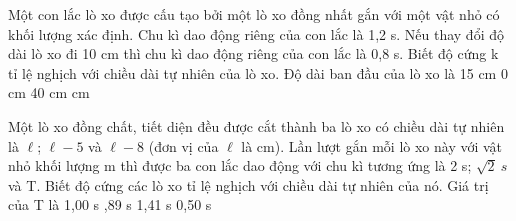 \begin{ex}%
Một con lắc lò xo được cấu tạo bởi một lò xo đồng nhất gắn với một vật nhỏ có khối lượng xác định. Chu kì dao động riêng của con lắc là 1,2 s. Nếu thay đổi độ dài lò xo đi 10 cm thì chu kì dao động riêng của con lắc là 0,8 s. Biết độ cứng k tỉ lệ nghịch với chiều dài tự nhiên của lò xo. Độ dài ban đầu của lò xo là
\choice
{15 cm}
{0 cm}
{40 cm}
{ cm}
\end{ex} 

\begin{ex}%
Một lò xo đồng chất, tiết diện đều được cắt thành ba lò xo có chiều dài tự nhiên là $\ell$; $\ell-5$ và $\ell-8$ (đơn vị của $\ell$ là cm). Lần lượt gắn mỗi lò xo này với vật nhỏ khối lượng m thì được ba con lắc dao động với chu kì tương ứng là 2 s; $\sqrt{2}\ s$ và T. Biết độ cứng các lò xo tỉ lệ nghịch với chiều dài tự nhiên của nó. Giá trị của T là
\choice
{1,00 s}
{,89 s}
{1,41 s}
{0,50 s}
\end{ex} 

